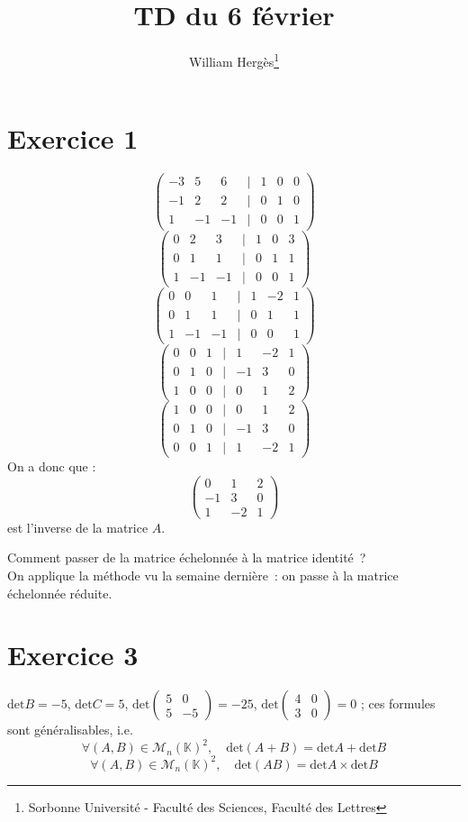 \documentclass[a4paper, titlepage]{article}
\title{TD du 6 février}
\author{William Hergès\thanks{Sorbonne Université - Faculté des Sciences, Faculté des Lettres}}
\newenvironment{lititle}%
{\vspace{7mm}\LobsterTwo \large}%
{\\}
\begin{document}
	\maketitle
	\section*{Exercice 1}
	$$ \begin{pmatrix} -3&5&6&|&1&0&0\\-1&2&2&|&0&1&0\\ 1&-1&-1&|&0&0&1 \end{pmatrix}  $$
	$$ \begin{pmatrix} 0&2&3&|&1&0&3\\0&1&1&|&0&1&1\\ 1&-1&-1&|&0&0&1 \end{pmatrix}  $$
	$$ \begin{pmatrix} 0&0&1&|&1&-2&1\\0&1&1&|&0&1&1\\ 1&-1&-1&|&0&0&1 \end{pmatrix}  $$
	$$ \begin{pmatrix} 0&0&1&|&1&-2&1\\0&1&0&|&-1&3&0\\ 1&0&0&|&0&1&2 \end{pmatrix}  $$
	$$ \begin{pmatrix} 1&0&0&|&0&1&2\\0&1&0&|&-1&3&0\\ 0&0&1&|&1&-2&1 \end{pmatrix}  $$
	On a donc que :
	$$ \begin{pmatrix} 0&1&2\\-1&3&0\\1&-2&1 \end{pmatrix}  $$ est l'inverse de la matrice $A$.

	\begin{lititle}
		Comment passer de la matrice échelonnée à la matrice identité~?
	\end{lititle}
	On applique la méthode vu la semaine dernière~: on passe à la matrice échelonnée réduite.
	\section*{Exercice 3}
	$\mathrm{det}B = -5$, $\mathrm{det}C=5$, $\mathrm{det}\begin{pmatrix} 5&0\\5&-5 \end{pmatrix} = -25$, $\mathrm{det}\begin{pmatrix} 4&0\\3&0 \end{pmatrix}=0$ ; ces formules sont généralisables, i.e.
	$$ \forall (A,B)\in\mathcal{M}_n(\mathbb{K})^2,\quad \mathrm{det}(A+B) = \mathrm{det}A+\mathrm{det}B $$
	$$ \forall (A,B)\in\mathcal{M}_n(\mathbb{K})^2,\quad \mathrm{det}(AB) = \mathrm{det}A\times\mathrm{det}B $$
\end{document}
